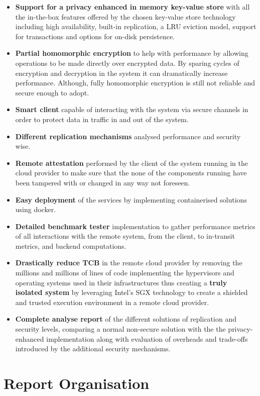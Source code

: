 \begin{itemize}
  \item \textbf{Support for a privacy enhanced in memory key-value store} with all the in-the-box features offered by the chosen key-value store technology including high availability, built-in replication, a \gls{LRU} eviction model, support for transactions and options for on-disk persistence.
  \item \textbf{Partial homomorphic encryption} to help with performance by allowing operations to be made directly over encrypted data. By sparing cycles of encryption and decryption in the system it can dramatically increase performance. Although, fully homomorphic encryption is still not reliable and secure enough to adopt.
  \item \textbf{Smart client} capable of interacting with the system via secure channels in order to protect data in traffic in and out of the system. 
  \item \textbf{Different replication mechanisms} analysed performance and security wise.
  \item \textbf{Remote attestation} performed by the client of the system running in the cloud provider to make sure that the none of the components running have been tampered with or changed in any way not foreseen.
  \item \textbf{Easy deployment} of the services by implementing containerised solutions using docker.
  \item \textbf{Detailed benchmark tester} implementation to gather performance metrics of all interactions with the remote system, from the client, to in-transit metrics, and backend computations.
  \item \textbf{Drastically reduce TCB} in the remote cloud provider by removing the millions and millions of lines of code implementing the hypervisors and operating systems used in their infrastructures thus creating a \textbf{truly isolated system} by leveraging Intel's \gls{SGX} technology to create a shielded and trusted execution environment in a remote cloud provider.
  \item \textbf{Complete analyse report} of the different solutions of replication and security levels, comparing a normal non-secure solution with the the privacy-enhanced implementation along with evaluation of overheads and trade-offs introduced by the additional security mechanisms.
\end{itemize}

\section{Report Organisation}
\label{sec:report_organisation}

